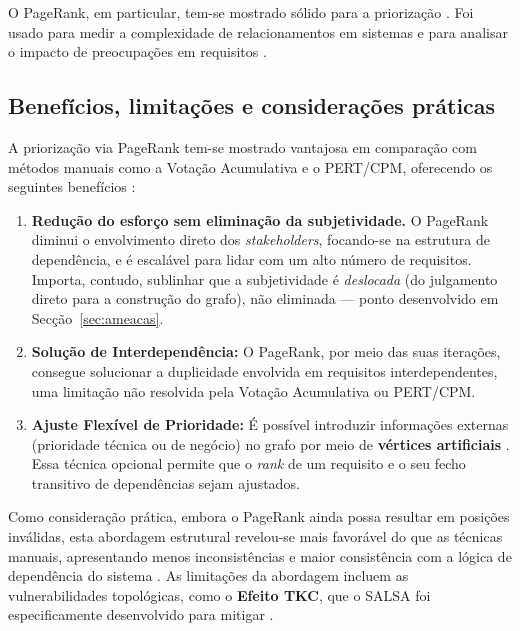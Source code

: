 O PageRank, em particular, tem-se mostrado sólido para a priorização
\parencite{silva2018}. Foi usado para medir a complexidade de
relacionamentos em sistemas \parencite{li2009} e para analisar o
impacto de preocupações em requisitos \parencite{jin2009}.

\subsection{Benefícios, limitações e considerações práticas}
\label{sec:beneficios}

A priorização via PageRank tem-se mostrado vantajosa em comparação
com métodos manuais como a Votação Acumulativa e o PERT/CPM,
oferecendo os seguintes benefícios \parencite{silva2018, he2014}:

\begin{enumerate}
    \item \textbf{Redução do esforço sem eliminação da subjetividade.}
        O PageRank diminui o envolvimento direto dos
        \emph{stakeholders}, focando-se na estrutura de dependência,
        e é escalável para lidar com um alto número de requisitos.
        Importa, contudo, sublinhar que a subjetividade é
        \emph{deslocada} (do julgamento direto para a construção do
        grafo), não eliminada --- ponto desenvolvido em
        Secção~\ref{sec:ameacas}.
    \item \textbf{Solução de Interdependência:} O PageRank, por meio
        das suas iterações, consegue solucionar a duplicidade
        envolvida em requisitos interdependentes, uma limitação não
        resolvida pela Votação Acumulativa ou PERT/CPM.
    \item \textbf{Ajuste Flexível de Prioridade:} É possível
        introduzir informações externas (prioridade técnica ou de
        negócio) no grafo por meio de \textbf{vértices artificiais}
        \parencite{silva2018}. Essa técnica opcional permite que o
        \emph{rank} de um requisito e o seu fecho transitivo de
        dependências sejam ajustados.
\end{enumerate}

Como consideração prática, embora o PageRank ainda possa resultar em
posições inválidas, esta abordagem estrutural revelou-se mais
favorável do que as técnicas manuais, apresentando menos
inconsistências e maior consistência com a lógica de dependência do
sistema \parencite{silva2018}. As limitações da abordagem incluem as
vulnerabilidades topológicas, como o \textbf{Efeito TKC}, que o SALSA
foi especificamente desenvolvido para mitigar \parencite{lempel2001}.
